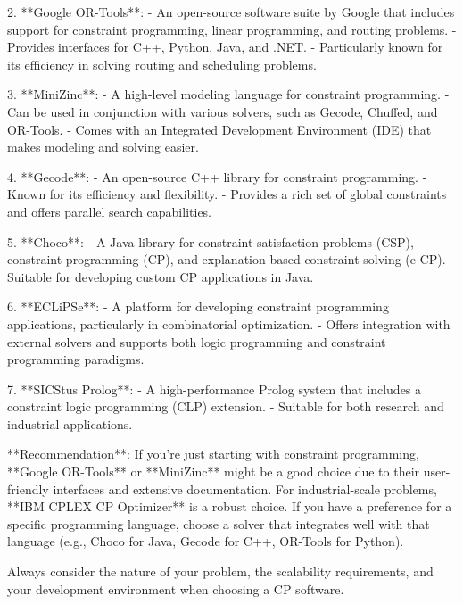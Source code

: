 2. **Google OR-Tools**:
   - An open-source software suite by Google that includes support for constraint programming, linear programming, and routing problems.
   - Provides interfaces for C++, Python, Java, and .NET.
   - Particularly known for its efficiency in solving routing and scheduling problems.

3. **MiniZinc**:
   - A high-level modeling language for constraint programming.
   - Can be used in conjunction with various solvers, such as Gecode, Chuffed, and OR-Tools.
   - Comes with an Integrated Development Environment (IDE) that makes modeling and solving easier.

4. **Gecode**:
   - An open-source C++ library for constraint programming.
   - Known for its efficiency and flexibility.
   - Provides a rich set of global constraints and offers parallel search capabilities.

5. **Choco**:
   - A Java library for constraint satisfaction problems (CSP), constraint programming (CP), and explanation-based constraint solving (e-CP).
   - Suitable for developing custom CP applications in Java.

6. **ECLiPSe**:
   - A platform for developing constraint programming applications, particularly in combinatorial optimization.
   - Offers integration with external solvers and supports both logic programming and constraint programming paradigms.

7. **SICStus Prolog**:
   - A high-performance Prolog system that includes a constraint logic programming (CLP) extension.
   - Suitable for both research and industrial applications.

**Recommendation**: 
If you're just starting with constraint programming, **Google OR-Tools** or **MiniZinc** might be a good choice due to their user-friendly interfaces and extensive documentation. For industrial-scale problems, **IBM CPLEX CP Optimizer** is a robust choice. If you have a preference for a specific programming language, choose a solver that integrates well with that language (e.g., Choco for Java, Gecode for C++, OR-Tools for Python).

Always consider the nature of your problem, the scalability requirements, and your development environment when choosing a CP software.
